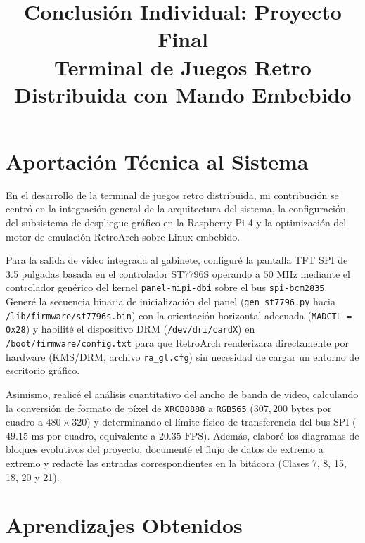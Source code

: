 \documentclass[conference]{IEEEtran}
\begin{document}
\title{Conclusión Individual: Proyecto Final \\
\large Terminal de Juegos Retro Distribuida con Mando Embebido}

\author{
}

\maketitle

\section*{Aportación Técnica al Sistema}

En el desarrollo de la terminal de juegos retro distribuida, mi contribución se centró en la integración general de la arquitectura del sistema, la configuración del subsistema de despliegue gráfico en la Raspberry Pi 4 y la optimización del motor de emulación RetroArch sobre Linux embebido.

Para la salida de video integrada al gabinete, configuré la pantalla TFT SPI de 3.5 pulgadas basada en el controlador ST7796S operando a $50\text{ MHz}$ mediante el controlador genérico del kernel \texttt{panel-mipi-dbi} sobre el bus \texttt{spi-bcm2835}. Generé la secuencia binaria de inicialización del panel (\texttt{gen\_st7796.py} hacia \texttt{/lib/firmware/st7796s.bin}) con la orientación horizontal adecuada (\texttt{MADCTL = 0x28}) y habilité el dispositivo DRM (\texttt{/dev/dri/cardX}) en \texttt{/boot/firmware/config.txt} para que RetroArch renderizara directamente por hardware (KMS/DRM, archivo \texttt{ra\_gl.cfg}) sin necesidad de cargar un entorno de escritorio gráfico.

Asimismo, realicé el análisis cuantitativo del ancho de banda de video, calculando la conversión de formato de píxel de \texttt{XRGB8888} a \texttt{RGB565} ($307{,}200\text{ bytes}$ por cuadro a $480 \times 320$) y determinando el límite físico de transferencia del bus SPI ($49.15\text{ ms}$ por cuadro, equivalente a $20.35\text{ FPS}$). Además, elaboré los diagramas de bloques evolutivos del proyecto, documenté el flujo de datos de extremo a extremo y redacté las entradas correspondientes en la bitácora (Clases 7, 8, 15, 18, 20 y 21).

\section*{Aprendizajes Obtenidos}
\end{document}
